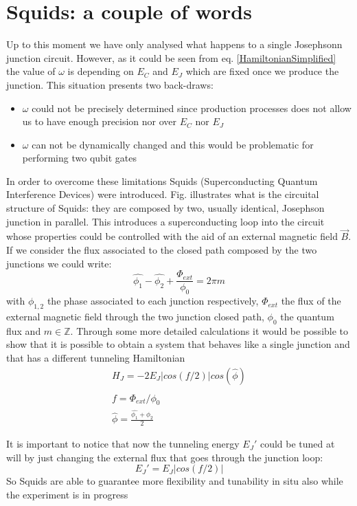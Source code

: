 \section{Squids: a couple of words}
Up to this moment we have only analysed what happens to a single Josephsonn junction circuit. However, as it could be seen from eq. \ref{HamiltonianSimplified} the value of $\omega$ is depending on $E_C$ and $E_J$ which are fixed once we produce the junction. This situation presents two back-draws:
\begin{itemize}
    \item $\omega$ could not be precisely determined since production processes does not allow us to have enough precision nor over $E_C$ nor $E_J$ 
    \item $\omega$ can not be dynamically changed and this would be problematic for performing two qubit gates
\end{itemize}
In order to overcome these limitations Squids (Superconducting Quantum Interference Devices) were introduced. Fig. illustrates what is the circuital structure of Squids: they are composed by two, usually identical, Josephson junction in parallel. This introduces a superconducting loop into the circuit whose properties could be controlled with the aid of an external magnetic field $\Vec{B}$.
If we consider the flux associated to the closed path composed by the two junctions we could write:
\begin{equation}
    \hat{\phi_1}-\hat{\phi_2} +\frac{\Phi_{ext}}{\phi_0} = 2\pi m
\end{equation}
with $\phi_{1,2}$ the phase associated to each junction respectively, $\Phi_{ext}$ the flux of the external magnetic field through the two junction closed path, $\phi_0$ the quantum flux and $m \in \mathbb{Z}$.
Through some more detailed calculations it would be possible to show that it is possible to obtain a system that behaves like a single junction and that has a different tunneling Hamiltonian  
\begin{equation}
\begin{split}
    H_J = -2E_J|cos(f/2)|cos(\hat{\phi})\\ \\
    f = \Phi_{ext}/\phi_0\\
    \hat{\phi} = \frac{\hat{\phi_1} +\hat{\phi_2}}{2}
    \end{split}
\end{equation}


It is important to notice that now the tunneling energy $E_J\prime$ could be tuned at will by just changing the external flux that goes through the junction loop:
\begin{equation}
    E_J\prime = E_J|cos(f/2)|
\end{equation}
So Squids are able to guarantee more flexibility and tunability in situ also while the experiment is in progress

